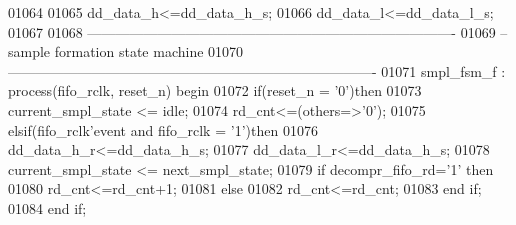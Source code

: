 \begin{DoxyCode}
01064         
01065 \textcolor{vhdlchar}{dd_data_h}\textcolor{vhdlchar}{<=}\textcolor{vhdlchar}{dd_data_h_s};
01066 \textcolor{vhdlchar}{dd_data_l}\textcolor{vhdlchar}{<=}\textcolor{vhdlchar}{dd_data_l_s};        
01067         
01068 \textcolor{keyword}{-------------------------------------------------------------------------------}
01069 \textcolor{keyword}{--sample formation state machine}
01070 \textcolor{keyword}{-------------------------------------------------------------------------------}
01071 smpl\_fsm\_f : \textcolor{keywordflow}{process}(fifo_rclk, reset_n) \textcolor{keywordflow}{begin}
01072     \textcolor{keywordflow}{if}\textcolor{vhdlchar}{(}\textcolor{vhdlchar}{reset_n} \textcolor{vhdlchar}{=} \textcolor{vhdlchar}{'}\textcolor{vhdllogic}{}\textcolor{vhdllogic}{0}\textcolor{vhdlchar}{'}\textcolor{vhdlchar}{)}\textcolor{keywordflow}{then}
01073         \textcolor{vhdlchar}{current_smpl_state} \textcolor{vhdlchar}{<=} \textcolor{vhdlchar}{idle};
01074         \textcolor{vhdlchar}{rd_cnt}\textcolor{vhdlchar}{<=}\textcolor{vhdlchar}{(}\textcolor{keywordflow}{others}\textcolor{vhdlchar}{=}\textcolor{vhdlchar}{>}\textcolor{vhdlchar}{'}\textcolor{vhdllogic}{}\textcolor{vhdllogic}{0}\textcolor{vhdlchar}{'}\textcolor{vhdlchar}{)};
01075     \textcolor{keywordflow}{elsif}\textcolor{vhdlchar}{(}\textcolor{vhdlchar}{fifo_rclk}\textcolor{vhdlchar}{'}\textcolor{vhdlkeyword}{event} \textcolor{keywordflow}{and} \textcolor{vhdlchar}{fifo_rclk} \textcolor{vhdlchar}{=} \textcolor{vhdlchar}{'}\textcolor{vhdllogic}{}\textcolor{vhdllogic}{1}\textcolor{vhdlchar}{'}\textcolor{vhdlchar}{)}\textcolor{keywordflow}{then}
01076         \textcolor{vhdlchar}{dd_data_h_r}\textcolor{vhdlchar}{<=}\textcolor{vhdlchar}{dd_data_h_s};
01077         \textcolor{vhdlchar}{dd_data_l_r}\textcolor{vhdlchar}{<=}\textcolor{vhdlchar}{dd_data_h_s};
01078         \textcolor{vhdlchar}{current_smpl_state} \textcolor{vhdlchar}{<=} \textcolor{vhdlchar}{next_smpl_state};
01079         \textcolor{keywordflow}{if} \textcolor{vhdlchar}{decompr_fifo_rd}\textcolor{vhdlchar}{=}\textcolor{vhdlchar}{'}\textcolor{vhdllogic}{}\textcolor{vhdllogic}{1}\textcolor{vhdlchar}{'} \textcolor{keywordflow}{then} 
01080             \textcolor{vhdlchar}{rd_cnt}\textcolor{vhdlchar}{<=}\textcolor{vhdlchar}{rd_cnt}\textcolor{vhdlchar}{+}\textcolor{vhdllogic}{}\textcolor{vhdllogic}{1};
01081             \textcolor{keywordflow}{else} 
01082             \textcolor{vhdlchar}{rd_cnt}\textcolor{vhdlchar}{<=}\textcolor{vhdlchar}{rd_cnt};
01083         \textcolor{keywordflow}{end} \textcolor{keywordflow}{if};
01084     \textcolor{keywordflow}{end} \textcolor{keywordflow}{if}; 

\end{DoxyCode}
